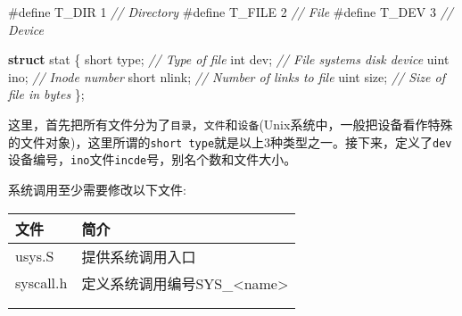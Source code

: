 \documentclass{article}
\newenvironment{Shaded}{}{}
\newcommand{\CommentTok}[1]{\textcolor[rgb]{0.38,0.63,0.69}{\textit{#1}}}
\newcommand{\DataTypeTok}[1]{\textcolor[rgb]{0.56,0.13,0.00}{#1}}
\newcommand{\DecValTok}[1]{\textcolor[rgb]{0.25,0.63,0.44}{#1}}
\newcommand{\KeywordTok}[1]{\textcolor[rgb]{0.00,0.44,0.13}{\textbf{#1}}}
\newcommand{\NormalTok}[1]{#1}
\newcommand{\OperatorTok}[1]{\textcolor[rgb]{0.40,0.40,0.40}{#1}}
\newcommand{\PreprocessorTok}[1]{\textcolor[rgb]{0.74,0.48,0.00}{#1}}
\begin{document}
\begin{Shaded}
  \begin{Highlighting}[]
    \PreprocessorTok{\#define T\_DIR  }\DecValTok{1}\PreprocessorTok{   }\CommentTok{// Directory}
    \PreprocessorTok{\#define T\_FILE }\DecValTok{2}\PreprocessorTok{   }\CommentTok{// File}
    \PreprocessorTok{\#define T\_DEV  }\DecValTok{3}\PreprocessorTok{   }\CommentTok{// Device}

    \KeywordTok{struct}\NormalTok{ stat }\OperatorTok{\{}
    \DataTypeTok{short}\NormalTok{ type}\OperatorTok{;}  \CommentTok{// Type of file}
    \DataTypeTok{int}\NormalTok{ dev}\OperatorTok{;}     \CommentTok{// File system\textquotesingle{}s disk device}
    \NormalTok{  uint ino}\OperatorTok{;}    \CommentTok{// Inode number}
    \DataTypeTok{short}\NormalTok{ nlink}\OperatorTok{;} \CommentTok{// Number of links to file}
    \NormalTok{  uint size}\OperatorTok{;}   \CommentTok{// Size of file in bytes}
    \OperatorTok{\};}
  \end{Highlighting}
\end{Shaded}

这里，首先把所有文件分为了\texttt{目录}，\texttt{文件}和\texttt{设备}(Unix系统中，一般把设备看作特殊的文件对象)，这里所谓的\texttt{short\ type}就是以上3种类型之一。接下来，定义了\texttt{dev}设备编号，\texttt{ino}文件\texttt{incde}号，别名个数和文件大小。

系统调用至少需要修改以下文件:

\begin{longtable}[]{@{}ll@{}}
  \toprule\noalign{}
  文件        & 简介                                         \\
  \midrule\noalign{}
  \endhead
  \bottomrule\noalign{}
  \endlastfoot
  usys.S    & 提供系统调用入口                                   \\
  syscall.h & 定义系统调用编号SYS\_\textless{}name\textgreater{} \\
            &                                            \\
            &                                            \\
\end{longtable}
\end{document}
